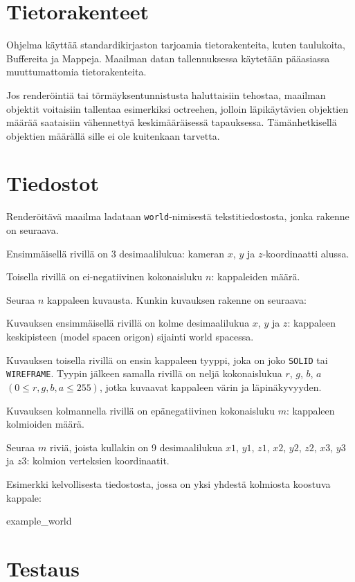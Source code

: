 \documentclass[12pt] {article}
\begin{document}
\section {Tietorakenteet}

Ohjelma käyttää standardikirjaston tarjoamia tietorakenteita, kuten taulukoita, Buffereita ja Mappeja. Maailman datan tallennuksessa käytetään pääasiassa muuttumattomia tietorakenteita.

Jos renderöintiä tai törmäyksentunnistusta haluttaisiin tehostaa, maailman objektit voitaisiin tallentaa esimerkiksi octreehen, jolloin läpikäytävien objektien määrää saataisiin vähennettyä keskimääräisessä tapauksessa. Tämänhetkisellä objektien määrällä sille ei ole kuitenkaan tarvetta.

\section {Tiedostot}

Renderöitävä maailma ladataan \texttt{world}-nimisestä tekstitiedostosta, jonka rakenne on seuraava.

Ensimmäisellä rivillä on 3 desimaalilukua: kameran $x$, $y$ ja $z$-koordinaatti alussa.

Toisella rivillä on ei-negatiivinen kokonaisluku $n$: kappaleiden määrä.

Seuraa $n$ kappaleen kuvausta. Kunkin kuvauksen rakenne on seuraava:

Kuvauksen ensimmäisellä rivillä on kolme desimaalilukua $x$, $y$ ja $z$: kappaleen keskipisteen (model spacen origon) sijainti world spacessa.

Kuvauksen toisella rivillä on ensin kappaleen tyyppi, joka on joko \texttt{SOLID} tai \texttt{WIREFRAME}. Tyypin jälkeen samalla rivillä on neljä kokonaislukua $r$, $g$, $b$, $a$ $(0 \leq r, g, b, a \leq 255)$, jotka kuvaavat kappaleen värin ja läpinäkyvyyden.

Kuvauksen kolmannella rivillä on epänegatiivinen kokonaisluku $m$: kappaleen kolmioiden määrä.

Seuraa $m$ riviä, joista kullakin on 9 desimaalilukua $x1$, $y1$, $z1$, $x2$, $y2$, $z2$, $x3$, $y3$ ja $z3$: kolmion verteksien koordinaatit.

Esimerkki kelvollisesta tiedostosta, jossa on yksi yhdestä kolmiosta koostuva kappale:

 {example_world}

\section {Testaus}
\end{document}
